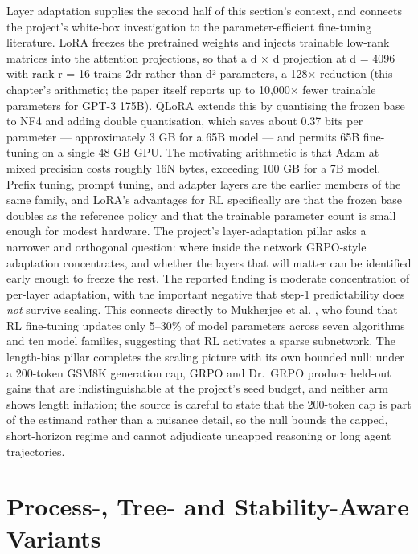 \documentclass[12pt,a4paper]{report}
\begin{document}
Layer adaptation supplies the second half of this section's context, and
connects the project's white-box investigation to the
parameter-efficient fine-tuning literature. LoRA \citep{hu2021lora}
freezes the pretrained weights and injects trainable low-rank matrices
into the attention projections, so that a d × d projection at d = 4096
with rank r = 16 trains 2dr rather than d² parameters, a 128× reduction
(this chapter's arithmetic; the paper itself reports up to 10,000× fewer
trainable parameters for GPT-3 175B). QLoRA \citep{dettmers2023qlora}
extends this by quantising the frozen base to NF4 and adding double
quantisation, which saves about 0.37 bits per parameter ---
approximately 3 GB for a 65B model --- and permits 65B fine-tuning on a
single 48 GB GPU. The motivating arithmetic is that Adam at mixed
precision costs roughly 16N bytes, exceeding 100 GB for a 7B model.
Prefix tuning, prompt tuning, and adapter layers are the earlier members
of the same family, and LoRA's advantages for RL specifically are that
the frozen base doubles as the reference policy and that the trainable
parameter count is small enough for modest hardware. The project's
layer-adaptation pillar asks a narrower and orthogonal question: where
inside the network GRPO-style adaptation concentrates, and whether the
layers that will matter can be identified early enough to freeze the
rest. The reported finding is moderate concentration of per-layer
adaptation, with the important negative that step-1 predictability does
\emph{not} survive scaling. This connects directly to Mukherjee et al.
\citep{mukherjee2025rlsubnetworks}, who found that RL fine-tuning
updates only 5--30\% of model parameters across seven algorithms and ten
model families, suggesting that RL activates a sparse subnetwork. The
length-bias pillar completes the scaling picture with its own bounded
null: under a 200-token GSM8K generation cap, GRPO and Dr.~GRPO produce
held-out gains that are indistinguishable at the project's seed budget,
and neither arm shows length inflation; the source is careful to state
that the 200-token cap is part of the estimand rather than a nuisance
detail, so the null bounds the capped, short-horizon regime and cannot
adjudicate uncapped reasoning or long agent trajectories.

\section{Process-, Tree- and Stability-Aware
Variants}\label{process--tree--and-stability-aware-variants}
\end{document}
